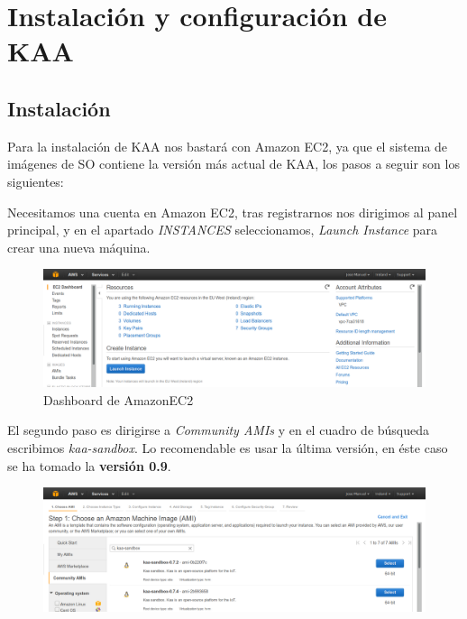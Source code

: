 \section{Instalación y configuración de KAA}

\subsection{Instalación}

Para la instalación de KAA nos bastará con Amazon EC2, ya que el sistema de imágenes de SO contiene la versión más actual de KAA, los pasos a seguir son los siguientes:

Necesitamos una cuenta en Amazon EC2, tras registrarnos nos dirigimos al panel principal, y en el apartado \textit{INSTANCES} seleccionamos, \textit{Launch Instance} para crear una nueva máquina.

\begin{figure}[!ht]
  \begin{center}
    \includegraphics[scale=0.30]{../images/kaa/1.png}
		\caption{Dashboard de AmazonEC2}
    \label{fig:1}
	\end{center}
\end{figure}

\newpage

El segundo paso es dirigirse a \textit{Community AMIs} y en el cuadro de búsqueda escribimos \textit{kaa-sandbox}. Lo recomendable es usar la última versión, en éste caso se ha tomado la \textbf{versión 0.9}.

\begin{figure}[!ht]
  \begin{center}
    \includegraphics[scale=0.30]{../images/kaa/2.png}
		\caption{}
    \label{Instancias preconfiguradas de Kaa en EC2}
	\end{center}
\end{figure}

